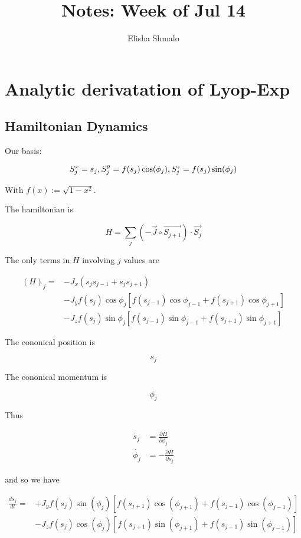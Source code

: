 \documentclass{article}
\author{Elisha Shmalo}
\title{Notes: Week of Jul 14}
\begin{document}
\maketitle

\section{Analytic derivatation of Lyop-Exp}

\subsection{Hamiltonian Dynamics}

Our basis:

\[
S_j^x = s_j, \space S_j^y = f(s_j)\cos(\phi_j), \space S_j^z = f(s_j)\sin(\phi_j)
\]

With $f(x) := \sqrt{1 - x^2}$.

The hamiltonian is

\[
H = \sum_j (-\vec{J} \circ \vec{S_{j+1}}) \cdot \vec{S_j}
\]

The only terms in $H$ involving $j$ values are

\begin{align*}
    (H)_j = &-J_x(s_js_{j-1} + s_js_{j+1}) \\
            &-J_yf(s_j)\cos\phi_j[f(s_{j-1})\cos\phi_{j-1} + f(s_{j+1})\cos\phi_{j+1}] \\
            &-J_zf(s_j)\sin\phi_j[f(s_{j-1})\sin\phi_{j-1} + f(s_{j+1})\sin\phi_{j+1}]
\end{align*}

The cononical position is

\[s_j\]

The cononical momentum is

\[\phi_j\]

Thus

\begin{align*}
    \dot{s_j} &= \frac{\partial H}{\partial \phi_j}\\
    \dot{\phi_j} &= -\frac{\partial H}{\partial s_j}
\end{align*}

and so we have

\begin{align*}
    \frac{ds_j}{dt} = &+J_yf(s_j)\sin(\phi_j)[f(s_{j+1})\cos(\phi_{j+1}) + f(s_{j-1})\cos(\phi_{j-1})] \\
                      &-J_zf(s_j)\cos(\phi_j)[f(s_{j+1})\sin(\phi_{j+1}) + f(s_{j-1})\sin(\phi_{j-1})]
\end{align*}
\end{document}
